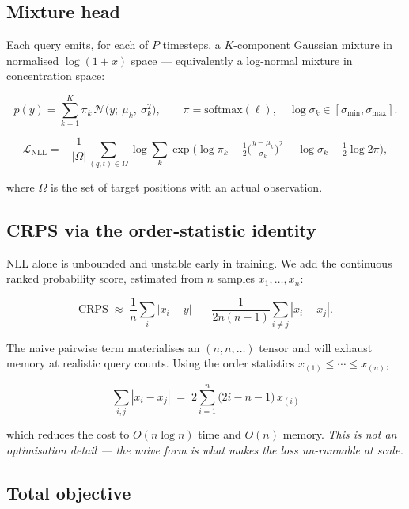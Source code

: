 \documentclass[11pt,a4paper]{article}
\begin{document}
\subsection{Mixture head}

Each query emits, for each of $P$ timesteps, a $K$-component Gaussian mixture in
normalised $\log(1+x)$ space --- equivalently a log-normal mixture in
concentration space:

\begin{equation}
p(y) = \sum_{k=1}^{K}\pi_k\,\mathcal{N}\!\big(y;\ \mu_k,\ \sigma_k^2\big),
\qquad
\pi = \mathrm{softmax}(\ell),\quad \log\sigma_k \in [\sigma_{\min},\sigma_{\max}].
\end{equation}

\begin{equation}
\mathcal{L}_{\text{NLL}} = -\frac{1}{|\Omega|}\sum_{(q,t)\in\Omega}
\log \sum_{k}\exp\!\Big(\log\pi_k -\tfrac{1}{2}\Big(\tfrac{y-\mu_k}{\sigma_k}\Big)^{2} - \log\sigma_k - \tfrac{1}{2}\log 2\pi\Big),
\end{equation}

where $\Omega$ is the set of target positions with an actual observation.

\subsection{CRPS via the order-statistic identity}

NLL alone is unbounded and unstable early in training. We add the continuous
ranked probability score, estimated from $n$ samples $x_1,\dots,x_n$:

\begin{equation}
\mathrm{CRPS} \;\approx\; \frac{1}{n}\sum_i |x_i-y| \;-\; \frac{1}{2n(n-1)}\sum_{i\neq j}|x_i-x_j| .
\end{equation}

The naive pairwise term materialises an $(n,n,\dots)$ tensor and will exhaust
memory at realistic query counts. Using the order statistics
$x_{(1)}\le\cdots\le x_{(n)}$,

\begin{equation}
\boxed{\;\sum_{i,j}|x_i-x_j| \;=\; 2\sum_{i=1}^{n}\big(2i-n-1\big)\,x_{(i)}\;}
\end{equation}

which reduces the cost to $O(n\log n)$ time and $O(n)$ memory. \emph{This is not
an optimisation detail --- the naive form is what makes the loss un-runnable at
scale.}

\subsection{Total objective}
\end{document}
